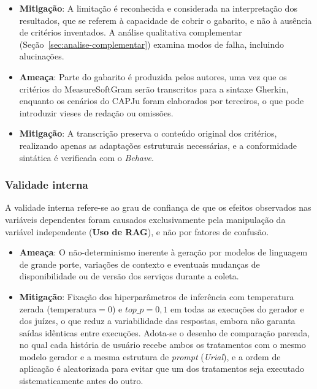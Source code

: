 \begin{itemize}
    \item \textbf{Mitigação}: A limitação é reconhecida e considerada na interpretação dos resultados, que se referem à capacidade de cobrir o gabarito, e não à ausência de critérios inventados. A análise qualitativa complementar (Seção~\ref{sec:analise-complementar}) examina modos de falha, incluindo alucinações.

    \item \textbf{Ameaça}: Parte do gabarito é produzida pelos autores, uma vez que os critérios do MeasureSoftGram serão transcritos para a sintaxe Gherkin, enquanto os cenários do CAPJu foram elaborados por terceiros, o que pode introduzir vieses de redação ou omissões.

    \item \textbf{Mitigação}: A transcrição preserva o conteúdo original dos critérios, realizando apenas as adaptações estruturais necessárias, e a conformidade sintática é verificada com o \textit{Behave}.
\end{itemize}

\subsubsection*{Validade interna}

A validade interna refere-se ao grau de confiança de que os efeitos observados nas variáveis dependentes foram causados exclusivamente pela manipulação da variável independente (\textbf{Uso de RAG}), e não por fatores de confusão.

\begin{itemize}
    \item \textbf{Ameaça}: O não-determinismo inerente à geração por modelos de linguagem de grande porte, variações de contexto e eventuais mudanças de disponibilidade ou de versão dos serviços durante a coleta.

    \item \textbf{Mitigação}: Fixação dos hiperparâmetros de inferência com temperatura zerada ($\mathrm{temperatura} = 0$) e $top\_p = 0{,}1$ em todas as execuções do gerador e dos juízes, o que reduz a variabilidade das respostas, embora não garanta saídas idênticas entre execuções. Adota-se o desenho de comparação pareada, no qual cada história de usuário recebe ambos os tratamentos com o mesmo modelo gerador e a mesma estrutura de \textit{prompt} (\textit{Urial}), e a ordem de aplicação é aleatorizada para evitar que um dos tratamentos seja executado sistematicamente antes do outro.
\end{itemize}

